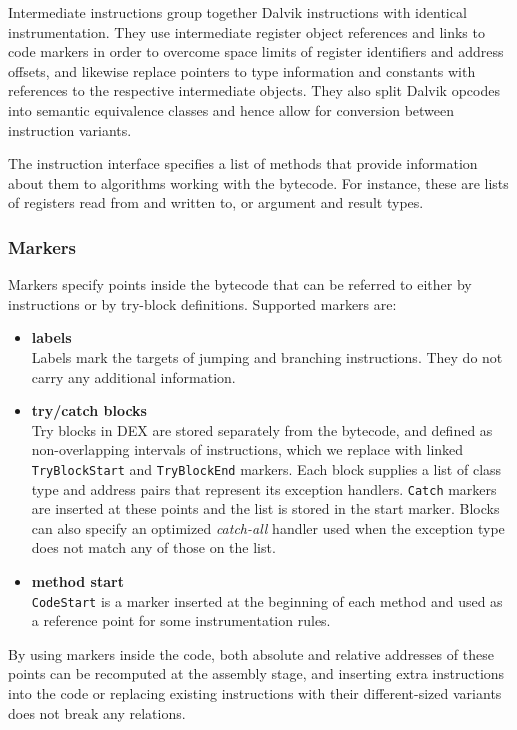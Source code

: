 \documentclass[12pt,twoside,notitlepage]{report}
\begin{document}
Intermediate instructions group together Dalvik instructions with identical instrumentation. They use intermediate register object references and links to code markers in order to overcome space limits of register identifiers and address offsets, and likewise replace pointers to type information and constants with references to the respective intermediate objects. They also split Dalvik opcodes into semantic equivalence classes and hence allow for conversion between instruction variants.

The instruction interface specifies a list of methods that provide information about them to algorithms working with the bytecode. For instance, these are lists of registers read from and written to, or argument and result types.

\subsubsection{Markers}

Markers specify points inside the bytecode that can be referred to either by instructions or by try-block definitions. Supported markers are:
\begin{itemize}
\item \textbf{labels} \\
Labels mark the targets of jumping and branching instructions. They do not carry any additional information.
\item \textbf{try/catch blocks} \\
Try blocks in DEX are stored separately from the bytecode, and defined as non-overlapping intervals of instructions, which we replace with linked \verb$TryBlockStart$ and \verb$TryBlockEnd$ markers. Each block supplies a list of class type and address pairs that represent its exception handlers. \verb$Catch$ markers are inserted at these points and the list is stored in the start marker. Blocks can also specify an optimized \emph{catch-all} handler used when the exception type does not match any of those on the list.
\item \textbf{method start} \\
\verb$CodeStart$ is a marker inserted at the beginning of each method and used as a reference point for some instrumentation rules.
\end{itemize}

By using markers inside the code, both absolute and relative addresses of these points can be recomputed at the assembly stage, and inserting extra instructions into the code or replacing existing instructions with their different-sized variants does not break any relations.
\end{document}
